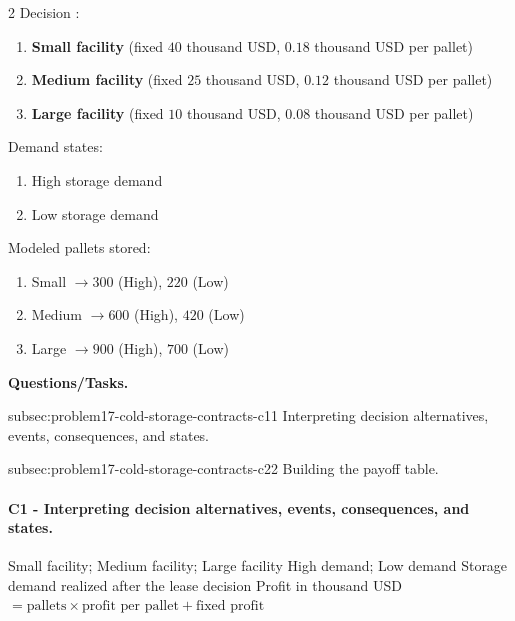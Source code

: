 	\begin{multicols}{2}
		Decision :
		\begin{enumerate}[label=\arabic*.]
			\item \textbf{Small facility} (fixed  $40$ thousand USD,  $0.18$ thousand USD per pallet)
			\item \textbf{Medium facility} (fixed  $25$ thousand USD,  $0.12$ thousand USD per pallet)
			\item \textbf{Large facility} (fixed  $10$ thousand USD,  $0.08$ thousand USD per pallet)
		\end{enumerate}

		Demand states:
		\begin{enumerate}[label=\arabic*.]
			\item High storage demand
			\item Low storage demand
		\end{enumerate}

			\columnbreak

		Modeled pallets stored:
		\begin{enumerate}[label=\arabic*.]
			\item Small $\to 300$ (High), $220$ (Low)
			\item Medium $\to 600$ (High), $420$ (Low)
			\item Large $\to 900$ (High), $700$ (Low)
		\end{enumerate}
	\end{multicols}

	\textbf{Questions/Tasks.}
	\begin{enumerate}
		\CriterionTask
		{subsec:problem17-cold-storage-contracts-c1}{1}
		{Interpreting decision alternatives, events, consequences, and states.}

		\CriterionTask
		{subsec:problem17-cold-storage-contracts-c2}{2}
		{Building the payoff table.}
	\end{enumerate}

	\paragraph*{C1 - Interpreting decision alternatives, events, consequences, and states.}
	\label{subsec:problem17-cold-storage-contracts-c1}
	\DecisionElementsTable
	{Small facility; Medium facility; Large facility}
	{High demand; Low demand}
	{Storage demand realized after the lease decision}
	{Profit in thousand USD $= \text{pallets} \times \text{profit per pallet} + \text{fixed profit}$}

